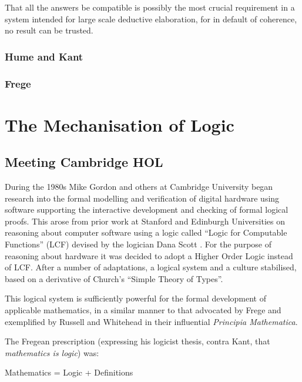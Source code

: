 \documentclass[10pt,titlepage]{book}
\begin{document}
That all the answers be compatible is possibly the most crucial requirement in a system intended for large scale deductive elaboration, for in default of coherence, no result can be trusted.

\subsection{Hume and Kant}



\subsection{Frege}

\cite{frege1980}


\chapter{The Mechanisation of Logic}

\section{Meeting Cambridge HOL}

During the 1980s Mike Gordon and others at Cambridge University began research into the formal modelling and verification of digital hardware using software supporting the interactive development and checking of formal logical proofs.
This arose from prior work at Stanford and Edinburgh Universities on reasoning about computer software using a logic called ``Logic for Computable Functions'' (LCF) devised by the logician Dana Scott \cite{scott1993type}.
For the purpose of reasoning about hardware it was decided to adopt a Higher Order Logic instead of LCF.
After a number of adaptations, a logical system and a culture stabilised, based on a derivative of Church's ``Simple Theory of Types''\cite{churchSTT}.

This logical system is sufficiently powerful for the formal development of applicable mathematics, in a similar manner to that advocated by Frege and exemplified by Russell and Whitehead in their influential \emph{Principia Mathematica}\cite{russell10}.

The Fregean prescription (expressing his logicist thesis, contra Kant, that \emph{mathematics is logic}) was:

\begin{center}
  Mathematics = Logic + Definitions
\end{center}
\end{document}
